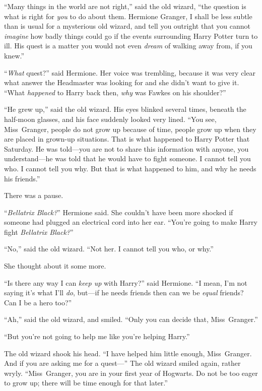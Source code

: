 “Many things in the world are not right,” said the old wizard, “the question is what is right for \emph{you} to do about them. Hermione Granger, I shall be less subtle than is usual for a mysterious old wizard, and tell you outright that you cannot \emph{imagine} how badly things could go if the events surrounding Harry Potter turn to ill. His quest is a matter you would not even \emph{dream} of walking away from, if you knew.”

“\emph{What} quest?” said Hermione. Her voice was trembling, because it was very clear what answer the Headmaster was looking for and she didn’t want to give it.
“What \emph{happened} to Harry back then, \emph{why} was Fawkes on his shoulder?”

“He grew up,” said the old wizard. His eyes blinked several times, beneath the half-moon glasses, and his face suddenly looked very lined.
“You see, Miss~Granger, people do not grow up because of time, people grow up when they are placed in grown-up situations. That is what happened to Harry Potter that Saturday. He was told—you are not to share this information with anyone, you understand—he was told that he would have to fight someone. I cannot tell you who. I cannot tell you why. But that is what happened to him, and why he needs his friends.”

There was a pause.

“\emph{Bellatrix Black?}” Hermione said. She couldn’t have been more shocked if someone had plugged an electrical cord into her ear.
“You’re going to make Harry fight \emph{Bellatrix Black?}”

“No,” said the old wizard.
“Not her. I cannot tell you who, or why.”

She thought about it some more.

“Is there any way I can \emph{keep up} with Harry?” said Hermione.
“I mean, I’m not saying it’s what I’ll \emph{do}, but—if he needs friends then can we be \emph{equal} friends? Can I be a hero too?”

“Ah,” said the old wizard, and smiled.
“Only you can decide that, Miss~Granger.”

“But you’re not going to help me like you’re helping Harry.”

The old wizard shook his head.
“I have helped him little enough, Miss~Granger. And if you are asking me for a quest—” The old wizard smiled again, rather wryly.
“Miss~Granger, you are in your first year of Hogwarts. Do not be too eager to grow up; there will be time enough for that later.”

